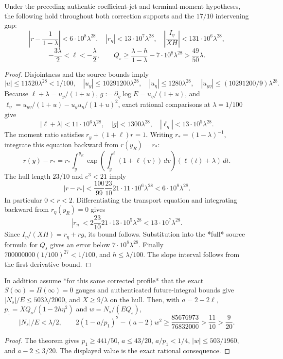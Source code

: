 \begin{theorem}
\label{thm:a11-backward-angular-20261021}
Under the preceding authentic coefficient-jet and terminal-moment
hypotheses, the following hold throughout both correction supports
and the \(17/10\) intervening gap:
\[
\left|r-\frac1{1-\lambda}\right|<6\cdot10^8\lambda^{28},
\quad |r_\eta|<13\cdot10^7\lambda^{28},
\quad \left|\frac{I_\eta}{XH}\right|<131\cdot10^6\lambda^{28},
\]
\[
-\frac{3\lambda}{2}<\ell<-\frac\lambda2,\qquad
Q_s\ge\frac{\lambda-h}{1-\lambda}
-7\cdot10^8\lambda^{28}>\frac{49}{50}\lambda.
\]
\end{theorem}
\begin{proof}
Disjointness and the source bounds imply
\[
|u|\le11520\lambda^{28}<1/100,\quad
|u_y|\le10291200\lambda^{28},\quad
|u_\eta|\le1280\lambda^{28},\quad
|u_{y\eta}|\le(10291200/9)\lambda^{28}.
\]
Because \(\ell+\lambda=u_y/(1+u)\),
\(g:=\partial_\eta\log E=u_\eta/(1+u)\), and
\(\ell_\eta=u_{y\eta}/(1+u)-u_yu_\eta/(1+u)^2\),
exact rational comparisons at \(\lambda=1/100\) give
\[
|\ell+\lambda|<11\cdot10^6\lambda^{28},\quad
|g|<1300\lambda^{28},\quad
|\ell_\eta|<13\cdot10^5\lambda^{28}.
\]
The moment ratio satisfies \(r_y+(1+\ell)r=1\).
Writing \(r_*=(1-\lambda)^{-1}\), integrate this equation
backward from \(r(y_R)=r_*\):
\[
r(y)-r_*
=r_*\int_y^{y_R}\exp\left(\int_y^t(1+\ell(v))\,dv\right)
(\ell(t)+\lambda)\,dt.
\]
The hull length \(23/10\) and \(e^3<21\) imply
\[
|r-r_*|<\frac{100}{99}\frac{23}{10}
21\cdot11\cdot10^6\lambda^{28}
<6\cdot10^8\lambda^{28}.
\]
In particular \(0<r<2\). Differentiating the transport
equation and integrating backward from \(r_\eta(y_R)=0\)
gives
\[
|r_\eta|<2\frac{23}{10}21\cdot13\cdot10^5\lambda^{28}
<13\cdot10^7\lambda^{28}.
\]
Since \(I_\eta/(XH)=r_\eta+rg\), its bound follows.
Substitution into the *full* source formula for \(Q_s\)
gives an error below \(7\cdot10^8\lambda^{28}\).
Finally \(700000000(1/100)^{27}<1/100\), and
\(h\le\lambda/100\). The slope interval follows from
the first derivative bound.
\end{proof}

\begin{corollary}
\label{cor:a11-backward-cone-20261021}
In addition assume *for this same corrected profile* that
the exact \(S(\infty)=\Pi(\infty)=0\) gauges and authenticated
future-integral bounds give \(|N_s|/E\le503\lambda/2000\),
and \(X\ge9/\lambda\) on the hull. Then, with
\(a=2-2\ell\), \(p_1=XQ_s/(1-2h\eta^2)\) and
\(w=N_s/(EQ_s)\),
\[
|N_s|/E<\lambda/2,\qquad
2(1-a/p_1)^2-(a-2)w^2\ge
\frac{85676973}{76832000}>\frac{11}{10}>\frac9{20}.
\]
\end{corollary}
\begin{proof}
The theorem gives \(p_1\ge441/50\),
\(a\le43/20\), \(a/p_1<1/4\),
\(|w|\le503/1960\), and \(a-2\le3/20\).
The displayed value is the exact rational consequence.
\end{proof}

